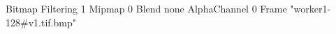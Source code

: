 {Bitmap
	{Filtering 1}
	{Mipmap 0}
	{Blend none}
	{AlphaChannel 0}
	{Frame "worker1-128#v1.tif.bmp"}
}
